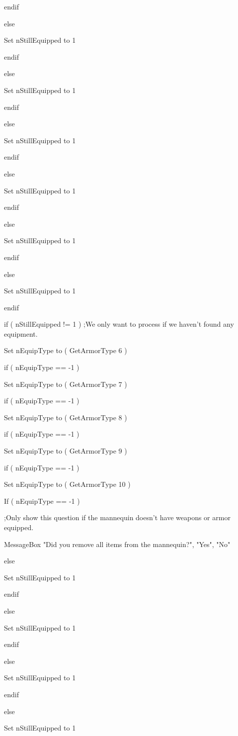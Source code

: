 \documentclass[
]{article}
\begin{document}
endif

else

Set nStillEquipped to 1

endif

else

Set nStillEquipped to 1

endif

else

Set nStillEquipped to 1

endif

else

Set nStillEquipped to 1

endif

else

Set nStillEquipped to 1

endif

else

Set nStillEquipped to 1

endif

if ( nStillEquipped != 1 ) ;We only want to process if we haven't found
any equipment.

Set nEquipType to ( GetArmorType 6 )

if ( nEquipType == -1 )

Set nEquipType to ( GetArmorType 7 )

if ( nEquipType == -1 )

Set nEquipType to ( GetArmorType 8 )

if ( nEquipType == -1 )

Set nEquipType to ( GetArmorType 9 )

if ( nEquipType == -1 )

Set nEquipType to ( GetArmorType 10 )

If ( nEquipType == -1 )

;Only show this question if the mannequin doesn't have weapons or armor
equipped.

MessageBox "Did you remove all items from the mannequin?", "Yes", "No"

else

Set nStillEquipped to 1

endif

else

Set nStillEquipped to 1

endif

else

Set nStillEquipped to 1

endif

else

Set nStillEquipped to 1
\end{document}

